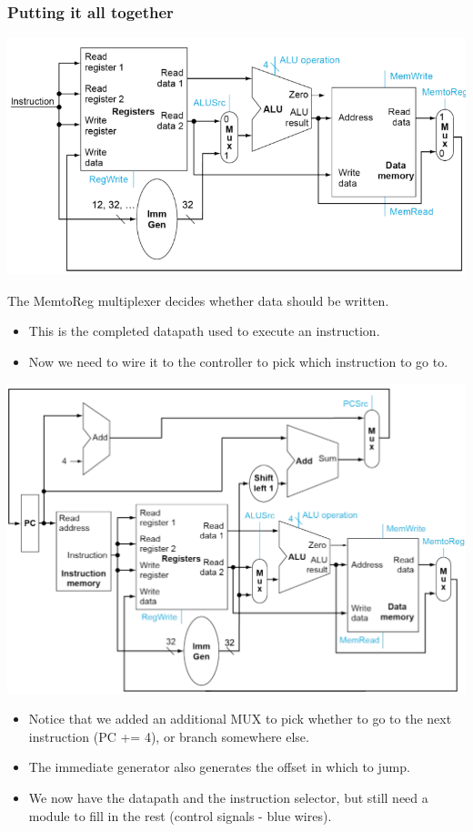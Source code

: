 \documentclass[10pt]{article}
\begin{document}
\subsubsection*{Putting it all together}
\begin{center}
    \includegraphics*[scale=0.7]{W2_10.png}
\end{center}
The MemtoReg multiplexer decides whether data should be written.
\begin{itemize}
    \item This is the completed datapath used to execute an instruction.
    \item Now we need to wire it to the controller to pick which instruction to go to.
\end{itemize}
\begin{center}
    \includegraphics*[scale=0.6]{W2_11.png}
\end{center}
\begin{itemize}
    \item Notice that we added an additional MUX to pick whether to go to the next instruction (PC += 4), or branch somewhere else.
    \item The immediate generator also generates the offset in which to jump.
    \item We now have the datapath and the instruction selector, but still need a module to fill in the rest (control signals - blue wires).
\end{itemize}
\end{document}
